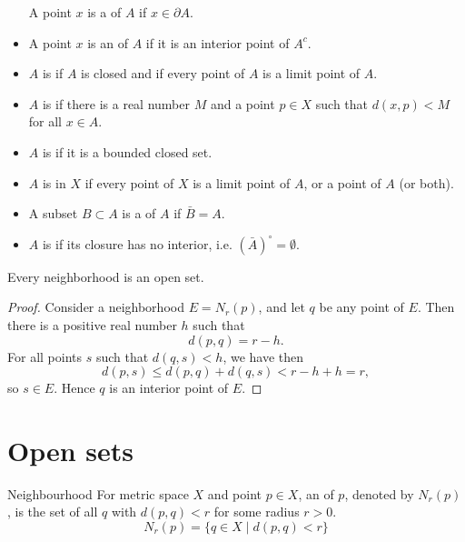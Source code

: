 \begin{itemize}
A point $x$ is a  of $A$ if $x\in\partial A$.

\item A point $x$ is an  of $A$ if it is an interior point of $A^c$.

\item $A$ is  if $A$ is closed and if every point of $A$ is a limit point of $A$.

\item $A$ is  if there is a real number $M$ and a point $p \in X$ such that $d(x,p) < M$ for all $x \in A$.

\item $A$ is  if it is a bounded closed set.

\item $A$ is  in $X$ if every point of $X$ is a limit point of $A$, or a point of $A$ (or both).

\item A subset $B\subset A$ is a  of $A$ if $\bar{B}=A$.

\item $A$ is  if its closure has no interior, i.e. $(\bar{A})^\circ=\emptyset$.
\end{itemize}

\begin{thrm}{}{}
Every neighborhood is an open set.
\end{thrm}

\begin{proof}
Consider a neighborhood $E=N_r(p)$, and let $q$ be any point of $E$. Then there is a positive real number $h$ such that
\[ d(p,q) = r-h. \]
For all points $s$ such that $d(q,s)<h$, we have then
\[ d(p,s) \le d(p,q) + d(q,s) < r - h + h = r, \]
so $s \in E$. Hence $q$ is an interior point of $E$.
\end{proof}


\pagebreak

\section{Open sets}
\begin{defn}{Neighbourhood}{}
For metric space $X$ and point $p \in X$, an  of $p$, denoted by $N_r(p)$, is the set of all $q$ with $d(p,q) < r$ for some radius $r > 0$.
\[ N_r(p) = \{q \in X \mid d(p,q) < r \} \]
\end{defn}

